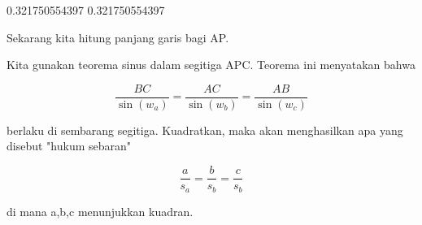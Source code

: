 \documentclass[a4paper,10pt]{article}
\begin{document}
\begin{eulernotebook}
\begin{eulercomment}
\begin{eulercomment}
\begin{eulercomment}
\begin{eulercomment}
\begin{eulercomment}
\begin{eulercomment}
\begin{eulercomment}
\begin{eulercomment}
\begin{eulercomment}
\begin{eulercomment}
\begin{eulercomment}
\begin{eulercomment}
\begin{eulercomment}
\begin{eulercomment}
\begin{eulercomment}
\begin{eulercomment}
\begin{eulercomment}
\begin{eulercomment}
\begin{eulerprompt}
\end{eulerprompt}
\begin{euleroutput}
  0.321750554397
  0.321750554397
\end{euleroutput}
\begin{eulercomment}
Sekarang kita hitung panjang garis bagi AP.

Kita gunakan teorema sinus dalam segitiga APC. Teorema ini menyatakan
bahwa

\end{eulercomment}
\begin{eulerformula}
\[
\frac{BC}{\sin(w_a)} = \frac{AC}{\sin(w_b)} = \frac{AB}{\sin(w_c)}
\]
\end{eulerformula}
\begin{eulercomment}
berlaku di sembarang segitiga. Kuadratkan, maka akan menghasilkan apa
yang disebut "hukum sebaran"

\end{eulercomment}
\begin{eulerformula}
\[
\frac{a}{s_a} = \frac{b}{s_b} = \frac{c}{s_b}
\]
\end{eulerformula}
\begin{eulercomment}
di mana a,b,c menunjukkan kuadran.


\end{eulercomment}
\end{eulercomment}
\end{eulercomment}
\end{eulercomment}
\end{eulercomment}
\end{eulercomment}
\end{eulercomment}
\end{eulercomment}
\end{eulercomment}
\end{eulercomment}
\end{eulercomment}
\end{eulercomment}
\end{eulercomment}
\end{eulercomment}
\end{eulercomment}
\end{eulercomment}
\end{eulercomment}
\end{eulercomment}
\end{eulercomment}
\end{eulernotebook}
\end{document}
